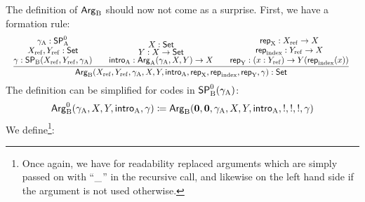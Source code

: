 \documentclass{article}
\begin{document}
The definition of $\mathsf{Arg}_{\mathrm{B}}$ should now not come as a surprise. First, we have a formation rule:
%
\[
\resizebox{\textwidth}{!}{%
$
\infer{\ArgB(\Xref, \Yref, \gammaA, \A, \B, \introA, \repA, \repIndex, \repB, \gamma) : \Set}
             {\deduce{\gamma : \SPB(\Xref, \Yref, \gammaA)}
                     {\deduce{\Xref, \Yref : \Set}{\gammaA : \SPAp}}
      & \quad \deduce{\introA : \ArgA(\gammaA, \A, \B) \to \A}
                     {\deduce{\B : \A \to \Set}{\A : \Set}}
              & \quad \deduce{\repB: (x : \Yref) \to \B(\repIndex(x))}
                             {\deduce{\repIndex : \Yref \to \A}
                                     {\repA : \Xref \to \A}}}
$
}
\]
%
The definition can be simplified for codes in $\mathsf{SP}^{0}_{\mathrm{B}}(\gamma_{\mathrm{A}})$:
\[
\mathsf{Arg}^{0}_{\mathrm{B}}(\gamma_{\mathrm{A}}, X, Y, \mathsf{intro}_{\mathrm{A}}, \gamma) \coloneqq
   \mathsf{Arg}_{\mathrm{B}}(\mathbf{0}, \mathbf{0}, \gamma_{\mathrm{A}}, X, Y, \mathsf{intro}_{\mathrm{A}}, !, !, !, \gamma)
\]
%
We define\footnote{Once again, we have for readability
  replaced arguments which are simply passed on with ``$\_$'' in
  the recursive call, and likewise on the left hand side if the
  argument is not used otherwise.}:
%
\end{document}
